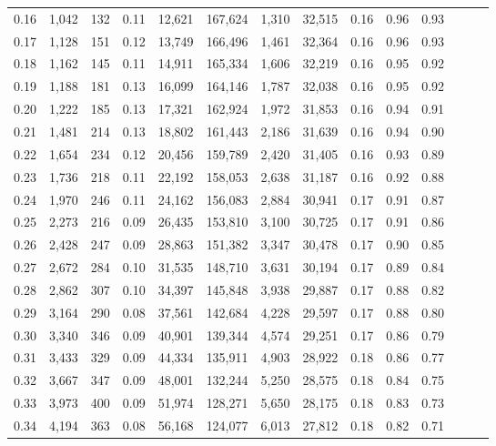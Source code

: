 \begin{tabular}{rrrrrrrrrrrrrr}
0.16 &  1,042 &  132 &  0.11 &   12,621 &  167,624 &   1,310 &  32,515 &  0.16 &  0.96 &      0.93 \\
0.17 &  1,128 &  151 &  0.12 &   13,749 &  166,496 &   1,461 &  32,364 &  0.16 &  0.96 &      0.93 \\
0.18 &  1,162 &  145 &  0.11 &   14,911 &  165,334 &   1,606 &  32,219 &  0.16 &  0.95 &      0.92 \\
0.19 &  1,188 &  181 &  0.13 &   16,099 &  164,146 &   1,787 &  32,038 &  0.16 &  0.95 &      0.92 \\
0.20 &  1,222 &  185 &  0.13 &   17,321 &  162,924 &   1,972 &  31,853 &  0.16 &  0.94 &      0.91 \\
0.21 &  1,481 &  214 &  0.13 &   18,802 &  161,443 &   2,186 &  31,639 &  0.16 &  0.94 &      0.90 \\
0.22 &  1,654 &  234 &  0.12 &   20,456 &  159,789 &   2,420 &  31,405 &  0.16 &  0.93 &      0.89 \\
0.23 &  1,736 &  218 &  0.11 &   22,192 &  158,053 &   2,638 &  31,187 &  0.16 &  0.92 &      0.88 \\
0.24 &  1,970 &  246 &  0.11 &   24,162 &  156,083 &   2,884 &  30,941 &  0.17 &  0.91 &      0.87 \\
0.25 &  2,273 &  216 &  0.09 &   26,435 &  153,810 &   3,100 &  30,725 &  0.17 &  0.91 &      0.86 \\
0.26 &  2,428 &  247 &  0.09 &   28,863 &  151,382 &   3,347 &  30,478 &  0.17 &  0.90 &      0.85 \\
0.27 &  2,672 &  284 &  0.10 &   31,535 &  148,710 &   3,631 &  30,194 &  0.17 &  0.89 &      0.84 \\
0.28 &  2,862 &  307 &  0.10 &   34,397 &  145,848 &   3,938 &  29,887 &  0.17 &  0.88 &      0.82 \\
0.29 &  3,164 &  290 &  0.08 &   37,561 &  142,684 &   4,228 &  29,597 &  0.17 &  0.88 &      0.80 \\
0.30 &  3,340 &  346 &  0.09 &   40,901 &  139,344 &   4,574 &  29,251 &  0.17 &  0.86 &      0.79 \\
0.31 &  3,433 &  329 &  0.09 &   44,334 &  135,911 &   4,903 &  28,922 &  0.18 &  0.86 &      0.77 \\
0.32 &  3,667 &  347 &  0.09 &   48,001 &  132,244 &   5,250 &  28,575 &  0.18 &  0.84 &      0.75 \\
0.33 &  3,973 &  400 &  0.09 &   51,974 &  128,271 &   5,650 &  28,175 &  0.18 &  0.83 &      0.73 \\
0.34 &  4,194 &  363 &  0.08 &   56,168 &  124,077 &   6,013 &  27,812 &  0.18 &  0.82 &      0.71 \\

\end{tabular}
